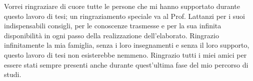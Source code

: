 \documentclass[a4paper,singleside,11pt]{report}
\begin{document}

\copertinatesi 
{}
\indice
\indicefigure
\indicetabelle
\iniziatesto






%
%
%

\appendix
% 


\ringraziamenti
Vorrei ringraziare di cuore tutte le persone che mi hanno supportato durante questo lavoro di tesi; un ringraziamento speciale va al Prof. Lattanzi per i suoi indispensabili consigli, per le conoscenze trasmesse e per la sua infinita disponibilità in ogni passo della realizzazione dell’elaborato.
Ringrazio infinitamente la mia famiglia, senza i loro insegnamenti e senza il loro supporto, questo lavoro di tesi non esisterebbe nemmeno.
Ringrazio tutti i miei amici per essere stati sempre presenti anche durante quest’ultima fase del mio percorso di studi.
\end{document}
